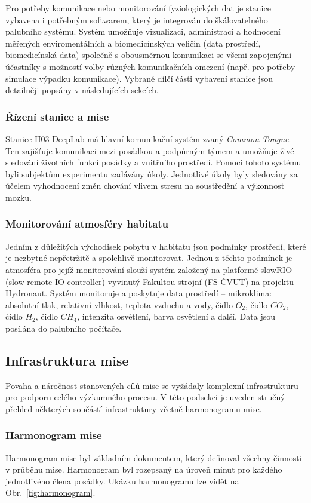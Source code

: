 Pro potřeby komunikace nebo monitorování fyziologických dat je stanice vybavena
i potřebným softwarem, který je integrován do škálovatelného palubního systému.
Systém umožňuje vizualizaci, administraci a hodnocení měřených enviromentálních
a biomedicínských veličin (data prostředí, biomedicínská data) společně s
obousměrnou komunikaci se všemi zapojenými účastníky s možností volby různých
komunikačních omezení (např. pro potřeby simulace výpadku komunikace). Vybrané
dílčí části vybavení stanice jsou detailněji popsány v následujících sekcích.

\subsubsection{Řízení stanice a mise}
\label{subsubsec:rizeni_stanice_mise}
Stanice H03 DeepLab má hlavní komunikační systém zvaný \textit{Common Tongue}.
Ten zajišťuje komunikaci mezi posádkou a podpůrným týmem a umožňuje živé
sledování životních funkcí posádky a vnitřního prostředí. Pomocí tohoto systému
byli subjektům experimentu zadávány úkoly. Jednotlivé úkoly byly sledovány za
účelem vyhodnocení změn chování vlivem stresu na soustředění a výkonnost mozku.

\subsubsection{Monitorování atmosféry habitatu}
Jedním z důležitých východisek pobytu v habitatu jsou podmínky prostředí, které
je nezbytné nepřetržitě a spolehlivě monitorovat. Jednou z těchto podmínek je
atmosféra pro jejíž monitorování slouží systém založený na platformě slowRIO
(slow remote IO controller) vyvinutý Fakultou strojní (FS ČVUT) na projektu
Hydronaut. Systém monitoruje a poskytuje data prostředí -- mikroklima: absolutní
tlak, relativní vlhkost, teplota vzduchu a vody, čidlo $O_2$, čidlo $CO_2$,
čidlo $H_2$, čidlo $CH_4$, intenzita osvětlení, barva osvětlení a další. Data
jsou posílána do palubního počítače.

\subsection{Infrastruktura mise}
\label{subsec:infrastruktura_mise}
Povaha a náročnost stanovených cílů mise se vyžádaly komplexní infrastrukturu
pro podporu celého výzkumného procesu. V této podsekci je uveden stručný přehled
některých součástí infrastruktury včetně harmonogramu mise.

\subsubsection{Harmonogram mise}
\label{subsubsec:harmonogram_mise}
Harmonogram mise byl základním dokumentem, který definoval všechny činnosti v
průběhu mise. Harmonogram byl rozepsaný na úroveň minut pro každého jednotlivého
člena posádky. Ukázku harmonogramu lze vidět na Obr.~\ref{fig:harmonogram}.

